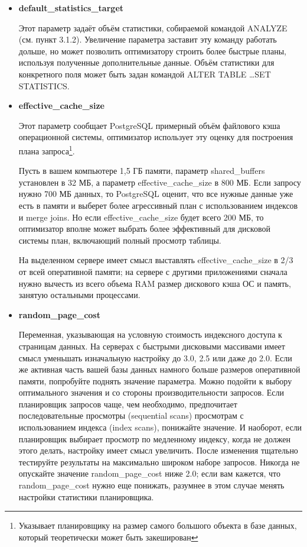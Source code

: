 \begin{itemize}
\item \textbf{default\_statistics\_target} 

Этот параметр задаёт объём статистики, собираемой командой ANALYZE (см. пункт 3.1.2). 
Увеличение параметра заставит эту команду работать дольше, но может позволить оптимизатору строить более быстрые планы, 
используя полученные дополнительные данные. Объём статистики для конкретного поля может быть задан командой 
ALTER TABLE \dots SET STATISTICS.

\item \textbf{effective\_cache\_size}

Этот параметр сообщает PostgreSQL примерный объём файлового кэша операционной системы, оптимизатор использует эту оценку для 
построения плана запроса\footnote{Указывает планировщику на размер самого большого объекта в базе данных, который 
теоретически может быть закеширован}.

Пусть в вашем компьютере 1,5 ГБ памяти, параметр shared\_buffers установлен в 32 МБ, а параметр effective\_cache\_size в 800 МБ. 
Если запросу нужно 700 МБ данных, то PostgreSQL оценит, что все нужные данные уже есть в памяти и выберет более агрессивный план с 
использованием индексов и merge joins. Но если effective\_cache\_size будет всего 200 МБ, то оптимизатор вполне может выбрать более 
эффективный для дисковой системы план, включающий полный просмотр таблицы.

На выделенном сервере имеет смысл выставлять effective\_cache\_size в 2/3 от всей оперативной памяти; на сервере с 
другими приложениями сначала нужно вычесть из всего объема RAM размер дискового кэша ОС и память, 
занятую остальными процессами.

\item \textbf{random\_page\_cost} 

Переменная, указывающая на условную стоимость индексного доступа к страницам данных. На серверах с быстрыми дисковыми 
массивами имеет смысл уменьшать изначальную настройку до 3.0, 2.5 или даже до 2.0. Если же активная часть вашей базы данных 
намного больше размеров оперативной памяти, попробуйте поднять значение параметра. Можно подойти к выбору оптимального значения 
и со стороны производительности запросов. Если планировщик запросов чаще, чем необходимо, предпочитает последовательные просмотры 
(sequential scans) просмотрам с использованием индекса (index scans), понижайте значение. И наоборот, если планировщик выбирает 
просмотр по медленному индексу, когда не должен этого делать, настройку имеет смысл увеличить. После изменения тщательно тестируйте 
результаты на максимально широком наборе запросов. Никогда не опускайте значение random\_page\_cost ниже 2.0; если вам кажется, 
что random\_page\_cost нужно еще понижать, разумнее в этом случае менять настройки статистики планировщика. 
\end{itemize}

